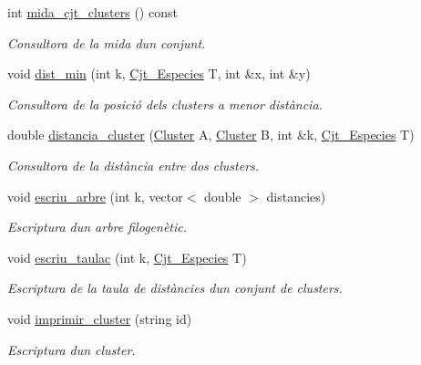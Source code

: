 \begin{DoxyCompactItemize}
int \hyperlink{class_cjt___clusters_af8b1e9dbb486ad03f9973ac72160bae1}{mida\+\_\+cjt\+\_\+clusters} () const
\begin{DoxyCompactList}\small\item\em Consultora de la mida d\textquotesingle{}un conjunt. \end{DoxyCompactList}\item 
void \hyperlink{class_cjt___clusters_a6cf197c0aa4bf1630c24fc0414f07378}{dist\+\_\+min} (int k, \hyperlink{class_cjt___especies}{Cjt\+\_\+\+Especies} T, int \&x, int \&y)
\begin{DoxyCompactList}\small\item\em Consultora de la posició dels clusters a menor distància. \end{DoxyCompactList}\item 
double \hyperlink{class_cjt___clusters_a94f19cb7786aec229365c7dc6f72ce70}{distancia\+\_\+cluster} (\hyperlink{class_cluster}{Cluster} A, \hyperlink{class_cluster}{Cluster} B, int \&k, \hyperlink{class_cjt___especies}{Cjt\+\_\+\+Especies} T)
\begin{DoxyCompactList}\small\item\em Consultora de la distància entre dos clusters. \end{DoxyCompactList}\item 
void \hyperlink{class_cjt___clusters_a8a0b0b5985ebe229db5a7d21a5766146}{escriu\+\_\+arbre} (int k, vector$<$ double $>$ distancies)
\begin{DoxyCompactList}\small\item\em Escriptura d\textquotesingle{}un arbre filogenètic. \end{DoxyCompactList}\item 
void \hyperlink{class_cjt___clusters_acf3f5238917b3b9aa0594ac3425d42a2}{escriu\+\_\+taulac} (int k, \hyperlink{class_cjt___especies}{Cjt\+\_\+\+Especies} T)
\begin{DoxyCompactList}\small\item\em Escriptura de la taula de distàncies d\textquotesingle{}un conjunt de clusters. \end{DoxyCompactList}\item 
void \hyperlink{class_cjt___clusters_a0540284cbc0495cff9ff214a6b4f77a2}{imprimir\+\_\+cluster} (string id)
\begin{DoxyCompactList}\small\item\em Escriptura d\textquotesingle{}un cluster. \end{DoxyCompactList}\end{DoxyCompactItemize}



